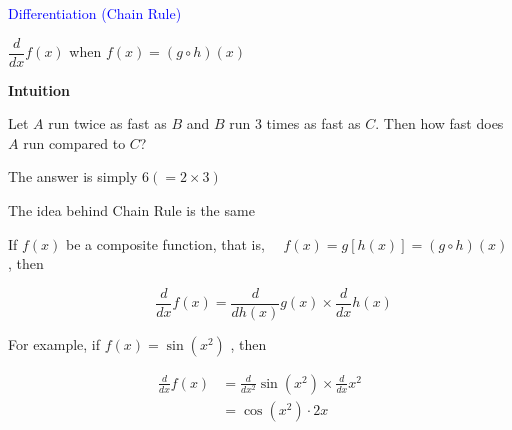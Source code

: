 \documentclass[14pt,fleqn]{extarticle}
\begin{document}

\begin{skill}
\begin{narrow}
\textcolor{blue}{Differentiation (Chain Rule)}

$\dfrac{d}{dx}f(x)$ when $f(x) = \left(g\circ h \right)(x)$ 
\end{narrow}

%

\reason

\textbf{Intuition}

Let $A$ run twice as fast as $B$ and 
$B$ run 3 times as fast as $C$. Then 
how fast does $A$ run compared to $C$?  \newline 

The answer is simply $6 (= 2\times 3)$\newline 

The idea behind Chain Rule is the same \newline 

If $f(x)$ be a composite function, that is, 
$\quad f(x) = g\left[ h(x) \right] = (g\circ h)(x)$, then 

\[ \qquad \frac{d}{dx} f(x) = \frac{d}{d h(x)}g(x)\times \frac{d}{dx} h(x) \]

For example, if $f(x) = \sin \left( x^2\right)$ , then 

\begin{align}
	\frac{d}{dx} f(x) &= \frac{d}{d x^2} \sin \left(x^2 \right)\times \frac{d}{dx} x^2  \\
	&= \cos \left(x^2 \right)\cdot 2x 
\end{align}
%

\end{skill}
\end{document}
